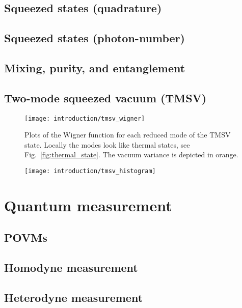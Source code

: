 \subsection{Squeezed states (quadrature)}

\subsection{Squeezed states (photon-number)}

\subsection{Mixing, purity, and entanglement}

\subsection{Two-mode squeezed vacuum (TMSV)}
\begin{figure}[htp]
\centering
\texttt{[image: introduction/tmsv\_wigner]}
\caption{\label{fig:tmsv_wigner} Plots of the Wigner function for each reduced mode of the TMSV state. Locally the modes look like thermal states, see Fig.~\ref{fig:thermal_state}. The vacuum variance is depicted in orange.}
\end{figure}

\begin{figure}[htp]
\centering
\texttt{[image: introduction/tmsv\_histogram]}
\caption{\label{fig:tmsv_histogram} }
\end{figure}

\section{Quantum measurement}

\subsection{POVMs}

\subsection{Homodyne measurement}

\subsection{Heterodyne measurement}

